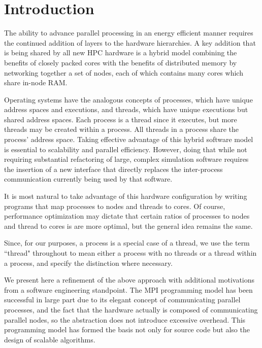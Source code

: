 \documentclass[final,1p,times]{elsarticle}
\begin{document}

\section{Introduction}
\label{sec:intro}

The ability to advance parallel processing in an energy efficient
manner requires the continued addition of layers to the hardware
hierarchies.
A key addition that is being shared by all new
HPC hardware is a hybrid model combining the benefits
of closely packed cores with the benefits of distributed memory
by networking together a set of nodes, each of which contains
many cores which share in-node RAM.

Operating systems have the analogous concepts of processes,
which have unique address spaces and executions, and threads, which
have unique executions but shared address spaces.
Each process is a thread since it executes, but more
threads may be created within a process.
All threads in a process share the process' address space.
Taking effective advantage of this hybrid software model is essential
to scalability and parallel efficiency.
However, doing that while not requiring substantial refactoring
of large, complex simulation software requires the insertion
of a new interface that directly replaces the inter-process communication
currently being used by that software.

It is most natural to take advantage of this hardware
configuration by writing programs that map processes to nodes
and threads to cores.
Of course, performance optimization may dictate that certain
ratios of processes to nodes and thread to cores is are more optimal,
but the general idea remains the same.

Since, for our purposes, a process is a special
case of a thread, we use the term ``thread" throughout
to mean either a process with no threads or a thread
within a process, and specify the distinction where necessary.

We present here a refinement of the above approach with additional
motivations from a software engineering standpoint.
The MPI programming model has been successful in large part due
to its elegant concept of communicating parallel processes,
and the fact that the hardware actually is composed of communicating parallel
nodes, so the abstraction does not introduce excessive overhead.
This programming model has formed the basis not only for source code
but also the design of scalable algorithms.
\end{document}
